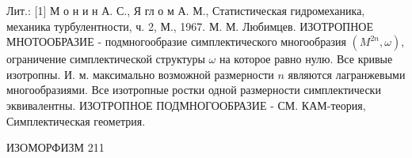 \documentclass[10pt]{article}
\begin{document}
Лит.: [1] М о н и н А. С., Я гл о м А. М., Статистическая гидромеханика, механика турбулентности, ч. 2, М., 1967. М. М. Любимцев. ИЗОТРОПНОЕ МНОТООБРАЗИЕ - подмногообразие симплектического многообразия $\left(M^{2 n}, \omega\right)$, ограничение симплектической структуры $\omega$ на которое равно нулю. Все кривые изотропны. И. м. максимально возможной размерности $n$ являются лагранжевыми многообразиями. Все изотропные ростки одной размерности симплектически эквивалентны. ИЗОТРОПНОЕ ПОДМНОГООБРАЗИЕ - СМ. КАМ-теория, Симплектическая геометрия.



ИЗОМОРФИЗМ 211
\end{document}
